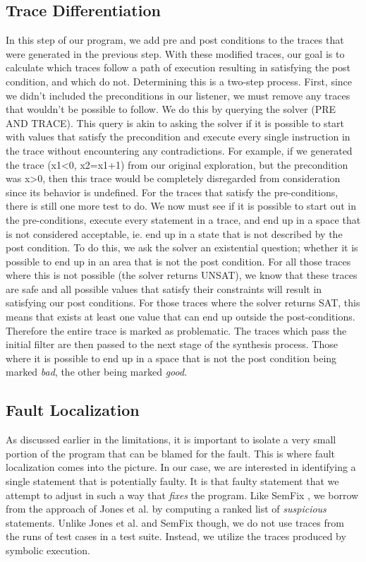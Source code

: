 \documentclass[]{article}
\begin{document}
\subsection{Trace Differentiation}
In this step of our program, we add pre and post conditions to the traces
that were generated in the previous step.  With these modified traces, our goal is to
 calculate which traces follow a path of execution resulting in satisfying the post condition, and which do not.  Determining this is a two-step process.  First, since we didn't included the
preconditions in our listener, we must remove any traces that wouldn't be
possible to follow.  We do this by querying the solver (PRE AND TRACE).  This
query is akin to asking the solver if it is possible to start with values that
satisfy the precondition and execute every single instruction in the trace
without encountering any contradictions.  For example, if we generated the
trace (x1<0, x2=x1+1) from our original exploration, but the precondition
was x>0, then this trace would be completely disregarded from consideration
since its behavior is undefined.  For the traces that satisfy the
pre-conditions, there is still one more test to do.  We now must see if it
is possible to start out in the pre-conditions, execute every statement in a
trace, and end up in a space that is not considered acceptable, ie. end up
in a state that is not described by the post condition.  To do this, we ask
the solver an existential question; whether it is possible to end up in an
area that is not the post condition.  For all those traces where this is not
possible (the solver returns UNSAT), we know that these traces are safe and
all possible values that satisfy their constraints will result in satisfying
our post conditions.  For those traces where the solver returns SAT, this
means that exists at least one value that can end up outside the
post-conditions.  Therefore the entire trace is marked as problematic.  The
traces which pass the initial filter are then passed to the next stage of
the synthesis process.  Those where it is possible to end up in a space that
is not the post condition being marked \emph{bad}, the other being marked
\emph{good}.

\subsection{Fault Localization}

As discussed earlier in the limitations, it is important to isolate a very
small portion of the program that can be blamed for the fault. This is where
fault localization comes into the picture. In our case, we are interested in
identifying a single statement that is potentially faulty. It is that faulty
statement that we attempt to adjust in such a way that \emph{fixes} the
program. Like SemFix \cite{}, we borrow from the approach of Jones et al.
\cite{JonesTarantula} by computing a ranked list of \emph{suspicious}
statements. Unlike Jones et al. and SemFix though, we do not use traces from
the runs of test cases in a test suite. Instead, we utilize the traces
produced by symbolic execution.
\end{document}
